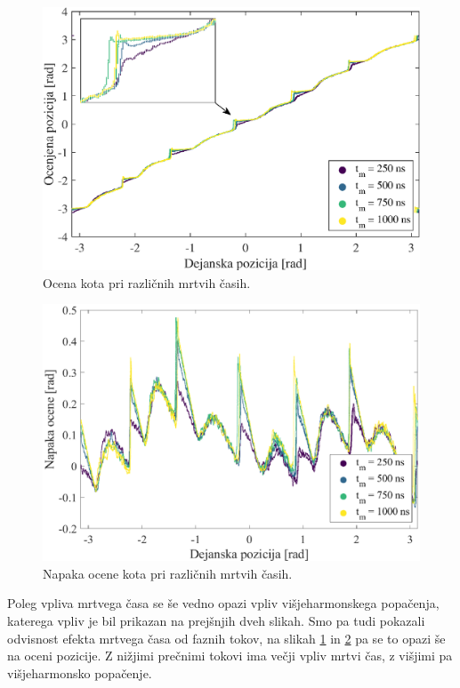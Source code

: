 \documentclass[a4paper,twoside,openright,12pt,slovene]{book}
\begin{document}
\begin{figure}[!htbp]
    \centering
    \includegraphics[width=0.9\columnwidth]{Slike/vsiljenaPozicijaMrtviCasPlot_angle.eps}
    \caption{\label{vsiljenaPozicijaMrtviCasPlot_angle} Ocena kota pri različnih mrtvih časih. }
\end{figure}

\begin{figure}[!htbp]
    \centering
    \includegraphics[width=1.05\columnwidth]{Slike/vsiljenaPozicijaMrtviCasPlot_angleError.eps}
    \caption{\label{vsiljenaPozicijaMrtviCasPlot_angleError} Napaka ocene kota pri različnih mrtvih časih. }
\end{figure}

\newpage
Poleg vpliva mrtvega časa se še vedno opazi vpliv višjeharmonskega popačenja, katerega vpliv je bil prikazan na prejšnjih dveh slikah. Smo pa tudi pokazali odvisnost efekta mrtvega časa od faznih
tokov, na slikah \ref{vsiljenaPozicijaMrtviCasPlot_angle} in \ref{vsiljenaPozicijaMrtviCasPlot_angleError} pa se to opazi še na oceni pozicije. Z nižjimi prečnimi tokovi ima večji vpliv mrtvi čas, z
višjimi pa višjeharmonsko popačenje.
\end{document}
